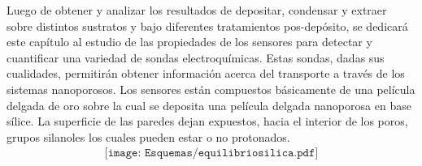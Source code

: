 	Luego de obtener y analizar los resultados de depositar, condensar y extraer \pdm\space sobre distintos sustratos y bajo diferentes tratamientos pos-depósito, se dedicará este capítulo al estudio de las propiedades de los sensores para detectar y cuantificar una variedad de sondas electroquímicas. Estas sondas, dadas sus cualidades, permitirán obtener información acerca del transporte a través de los sistemas nanoporosos. Los sensores están compuestos básicamente de una película delgada de oro sobre la cual se deposita  una película delgada nanoporosa en base sílice. La superficie de las paredes dejan expuestos, hacia el interior de los poros, grupos silanoles los cuales pueden estar o no protonados.\cite{Brinker1990,Soler-Illia2011} 
			\begin{equation}
				\begin{aligned}
				\texttt{[image: Esquemas/equilibriosilica.pdf]}
				\label{eq:equilibriosilica}
				\end{aligned}
				\end{equation}

